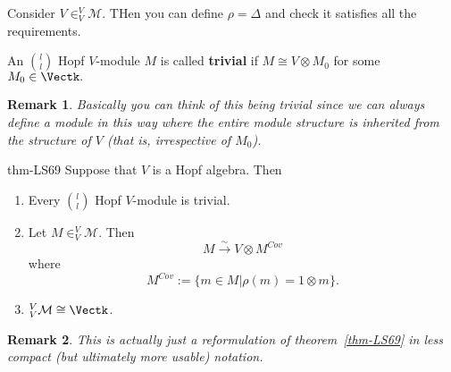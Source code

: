 \documentclass[12pt]{article}
\theoremstyle{break}
\theoremstyle{nonumberbreak}
\theoremstyle{changebreak}
\newtheorem{thm}{Theorem}[subsection]
\newenvironment{thm-prime}[1]
  {\renewcommand{\thethm}{\ref{#1}$'$}%
   \addtocounter{thm}{-1}%
   \begin{thm}}
  {\end{thm}}
\theoremstyle{break}
\theoremstyle{nonumberbreak}
\theoremstyle{nonumberplain}
\theoremstyle{change}
\newtheorem{rmk}[thm]{Remark}
\begin{document}
\begin{ex}
	Consider $V\in _V^V\mathcal{M}$. THen you can define $\rho=\Delta$ and check it satisfies all the requirements.
\end{ex}
\begin{defn}
	An $\binom{l}{l}$ Hopf $V$-module $M$ is called \textbf{trivial} if $M\cong V\otimes M_0$ for some $M_0\in\Vectk.$
\end{defn}
\begin{rmk}
	Basically you can think of this being trivial since we can \textit{always} define a module in this way
	where the entire module structure is inherited from the structure of $V$ (that is, irrespective of $M_0$).
\end{rmk}
\begin{thm-prime}{thm-LS69}%
	Suppose that $V$ is a Hopf algebra. Then
	\begin{enumerate}
		\item Every $\binom{l}{l}$ Hopf $V$-module is trivial.
		\item Let $M\in _V^V\mathcal{M}$. Then 
		\[M\xrightarrow{\sim} V\otimes M^{Cov}\]
		where
		\[M^{Cov}:=\{m\in M|\rho(m)=1\otimes m\}.\]
		\item $_V^V\mathcal{M}\cong \Vectk$.
	\end{enumerate}
\end{thm-prime}
\begin{rmk}
	This is actually just a reformulation of theorem~\ref{thm-LS69} in less compact (but ultimately more usable) notation.
\end{rmk}
\end{document}
